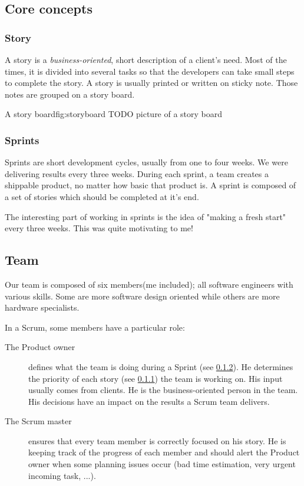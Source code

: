 \subsection{Core concepts}

\subsubsection{Story}\label{sec:story}
A story is a \emph{business-oriented}, short description of a client's
need. Most of the times, it is divided into several tasks so that the developers
can take small steps to complete the story. A story is usually printed or
written on sticky note. Those notes are grouped on a story board.

\begin{figureGraphics}{A story board}{fig:storyboard}
    TODO picture of a story board
\end{figureGraphics}


\subsubsection{Sprints}\label{sec:sprint}
Sprints are short development cycles, usually from one to four weeks. We were
delivering results every three weeks. During each sprint, a team creates a
shippable product, no matter how basic that product is. A sprint is composed of
a set of stories which should be completed at it's end.

The interesting part of working in sprints is the idea of "making a fresh start" every three weeks. This
was quite motivating to me!


\subsection{Team}
Our team is composed of six members(me included); all software engineers with various
skills. Some are more software design oriented while others are more hardware
specialists.

In a Scrum, some members have a particular role:
\begin{description}
    \item[The Product owner]
        defines what the team is doing during a Sprint (see \ref{sec:sprint}).
        He determines the priority of each story (see \ref{sec:story}) the team is working on. His input usually comes from
        clients. He is the business-oriented person in the team. His decisions have an impact on the results a Scrum team delivers.
    \item[The Scrum master]
        ensures that every team member is correctly focused on his story. He is keeping track of the progress of each member and
        should alert the Product owner when some planning issues occur (bad time estimation, very urgent incoming task, ...).
\end{description}

